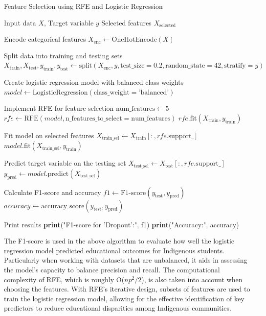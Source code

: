 \documentclass[final,12p,twocolumn]{article}
\begin{document}
\begin{algorithm}
\caption{Feature Selection using RFE and Logistic Regression}
\label{alg:feature-selection}
\small
\begin{algorithmic}[1] %
    \REQUIRE Input data $X$, Target variable $y$
    \ENSURE Selected features $X_{\text{selected}}$

    \STATE Encode categorical features
    \STATE $X_{\text{enc}} \gets \text{OneHotEncode}(X)$

    \STATE Split data into training and testing sets
    \STATE $X_{\text{train}}, X_{\text{test}}, y_{\text{train}}, y_{\text{test}} \gets \text{split}(X_{\text{enc}}, y, \text{test\_size} = 0.2, \text{random\_state} = 42, \text{stratify} = y)$

    \STATE Create logistic regression model with balanced class weights
    \STATE $model \gets \text{LogisticRegression}(\text{class\_weight} = \text{'balanced'})$

    \STATE Implement RFE for feature selection
    \STATE $\text{num\_features} \gets 5$
    \STATE $rfe \gets \text{RFE}(model, \text{n\_features\_to\_select} = \text{num\_features})$
    \STATE $rfe.\text{fit}(X_{\text{train}}, y_{\text{train}})$

    \STATE Fit model on selected features
    \STATE $X_{\text{train\_sel}} \gets X_{\text{train}}[:, rfe.\text{support\_}]$
    \STATE $model.\text{fit}(X_{\text{train\_sel}}, y_{\text{train}})$

    \STATE Predict target variable on the testing set
    \STATE $X_{\text{test\_sel}} \gets X_{\text{test}}[:, rfe.\text{support\_}]$
    \STATE $y_{\text{pred}} \gets model.\text{predict}(X_{\text{test\_sel}})$

    \STATE Calculate F1-score and accuracy
    \STATE $f1 \gets \text{F1-score}(y_{\text{test}}, y_{\text{pred}})$
    \STATE $accuracy \gets \text{accuracy\_score}(y_{\text{test}}, y_{\text{pred}})$

    \STATE Print results
    \STATE \textbf{print}("F1-score for 'Dropout':", f1)
    \STATE \textbf{print}("Accuracy:", accuracy)
\end{algorithmic}
\end{algorithm}

The F1-score is used in the above algorithm to evaluate how well the
logistic regression model predicted educational outcomes for Indigenous students. Particularly when working with datasets that are unbalanced, it aids in assessing the model’s capacity to balance precision and recall. The computational complexity of RFE, which is roughly O($np^2/2$), is also taken into account when choosing the features. With RFE’s iterative design, subsets of features are used to train the logistic regression model, allowing for the effective identification of key predictors to reduce educational disparities among Indigenous communities.
\end{document}
